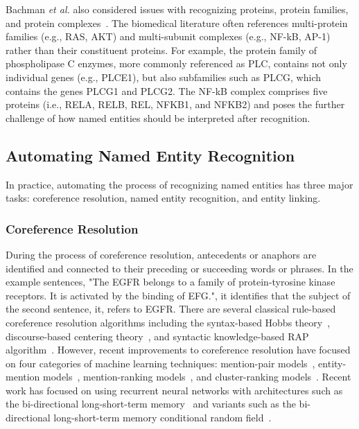 Bachman \textit{et al.} also considered issues with recognizing proteins, protein families, and protein complexes~\cite{Bachman2018}.
The biomedical literature often references multi-protein families (e.g., RAS, AKT) and multi-subunit complexes (e.g., NF-kB, AP-1) rather than their constituent proteins.
For example, the protein family of phospholipase C enzymes, more commonly referenced as PLC, contains not only individual genes (e.g., PLCE1), but also subfamilies such as PLCG, which contains the genes PLCG1 and PLCG2.
The NF-kB complex comprises five proteins (i.e., RELA, RELB, REL, NFKB1, and NFKB2) and poses the further challenge of how named entities should be interpreted after recognition.

\subsection{Automating Named Entity Recognition}

In practice, automating the process of recognizing named entities has three major tasks: coreference resolution, named entity recognition, and entity linking.

\subsubsection*{Coreference Resolution}

During the process of coreference resolution, antecedents or anaphors are identified and connected to their preceding or succeeding words or phrases.
In the example sentences, "The EGFR belongs to a family of protein-tyrosine kinase receptors.
It is activated by the binding of EFG.", it identifies that the subject of the second sentence, it, refers to EGFR.
There are several classical rule-based coreference resolution algorithms including the syntax-based Hobbs theory~\cite{Hobbs1978}, discourse-based centering theory~\cite{Brennan1987}, and syntactic knowledge-based RAP algorithm~\cite{Brennan1987}.
However, recent improvements to coreference resolution have focused on four categories of machine learning techniques: mention-pair models~\cite{Soon2001,Ng2002,Bengtson2008}, entity-mention models~\cite{Luo2004,Yang2004,Yang2008}, mention-ranking models~\cite{Lee2011,Denis2007,Rahman2009,martschat2015}, and cluster-ranking models~\cite{Rahman2011,Ma2014,Clark2016}.
Recent work has focused on using recurrent neural networks with architectures such as the bi-directional long-short-term memory~\cite{Li2018} and variants such as the bi-directional long-short-term memory conditional random field~\cite{Giorgi526244}.

